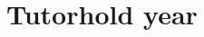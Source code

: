 \documentclass[10pt]{article}
\newenvironment{tutorhold}[1]{%
  \subsubsection*{#1}\begin{itemize}}
  {\end{itemize}}
\begin{document}
\section*{Tutorhold {{ year }}}
\label{sec:tutorhold}
\begin{multicols}{2}
  {%
  {%
  {%
  {%
\end{multicols}
\end{document}
